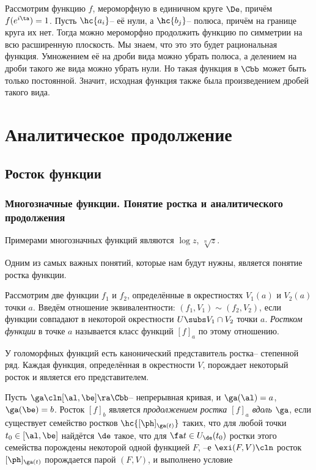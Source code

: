 \documentclass[a4paper]{article}
\begin{document}
Рассмотрим функцию $f$, мероморфную в единичном круге $\De$, причём $f(e^{i\ta})=1$. Пусть $\hc{a_i}$-- её нули,
а $\hc{b_j}$-- полюса, причём на границе круга их нет.
Тогда можно мероморфно продолжить функцию по симметрии на всю расширенную плоскость. Мы знаем, что это это будет
рациональная функция. Умножением её на дроби вида
можно убрать полюса, а делением на дроби такого же вида можно убрать нули. Но такая функция в $\Cbb$ может быть только
постоянной. Значит, исходная функция также была произведением дробей такого вида.

\section{Аналитическое продолжение}

\subsection{Росток функции}

\subsubsection{Многозначные функции. Понятие ростка и аналитического продолжения}

Примерами многозначных функций являются $\log z$, $\sqrt[n]{z}$.

Одним из самых важных понятий, которые нам будут нужны, является понятие ростка функции.

\begin{df}
Рассмотрим две функции $f_1$ и $f_2$, определённые в окрестностях $V_1(a)$ и $V_2(a)$ точки $a$. Введём отношение
эквивалентности: $(f_1, V_1) \sim (f_2, V_2)$, если функции совпадают в некоторой окрестности $U \subs V_1 \cap V_2$
точки $a$. \emph{Ростком функции} в точке $a$ называется класс функций $[f]_a$ по этому отношению.
\end{df}

У голоморфных функций есть канонический представитель ростка-- степенной ряд.
Каждая функция, определённая в окрестности $V$, порождает некоторый росток и является его представителем.

\begin{df}
Пусть $\ga\cln[\al,\be]\ra\Cbb$-- непрерывная кривая, и $\ga(\al)=a$, $\ga(\be)=b$.
Росток $[f]_b$ является \emph{продолжением ростка $[f]_a$ вдоль $\ga$}, если существует семейство ростков
$\hc{[\ph]_{\ga(t)}}$ таких, что для любой точки $t_0\in[\al,\be]$ найдётся $\de$ такое, что для $\fa t \in U_\de(t_0)$
ростки этого семейства порождены некоторой одной функцией $F$, --е $\exi (F,V)\cln$ росток $[\ph]_{\ga(t)}$ порождается
парой $(F, V)$, и выполнено условие
\end{df}
\end{document}

